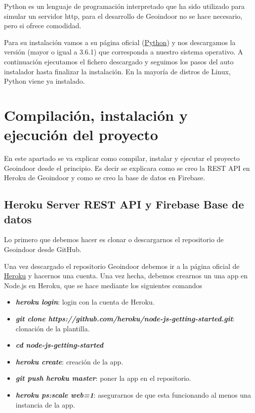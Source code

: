 Python es un lenguaje de programación interpretado que ha sido utilizado para simular un servidor http, para el desarrollo de Geoindoor no se hace necesario, pero si ofrece comodidad.

Para su instalación vamos a su página oficial (\href{https://www.python.org/downloads/}{Python}) y nos descargamos la versión (mayor o igual a 3.6.1) que corresponda a nuestro sistema operativo. A continuación ejecutamos el fichero descargado y seguimos los pasos del auto instalador hasta finalizar la instalación. En la mayoría de distros de Linux, Python viene ya instalado.



\section{Compilación, instalación y ejecución del proyecto}
En este apartado se va explicar como compilar, instalar y ejecutar el proyecto Geoindoor desde el principio. Es decir se explicara como se creo la REST API en Heroku de Geoindoor y como se creo la base de datos en Firebase.


\subsection{Heroku Server REST API y Firebase Base de datos}

Lo primero que debemos hacer es clonar o descargarnos el repositorio de Geoindoor desde GitHub.


Una vez descargado el repositorio Geoindoor debemos ir a la página oficial de \href{https://id.heroku.com/login}{Heroku} y hacernos una cuenta. Una vez hecha, debemos crearnos un una app en Node.js en Heroku, que se hace mediante los siguientes comandos

\begin{itemize}
	\item \textbf{\textit{heroku login}}: login con la cuenta de Heroku.
	\item \textbf{\textit{git clone https://github.com/heroku/node-js-getting-started.git}}: clonación de la plantilla.
	\item \textbf{\textit{cd node-js-getting-started}}
	\item \textbf{\textit{heroku create}}: creación de la app.
	\item \textbf{\textit{git push heroku master}}: poner la app en el repositorio.
	\item \textbf{\textit{heroku ps:scale web=1}}: asegurarnos de que esta funcionando al menos una instancia de la app.
\end{itemize}

